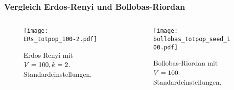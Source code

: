 \begin{frame}[t]
    \frametitle{Vergleich Erdos-Renyi und Bollobas-Riordan}
    \begin{columns}
        \begin{column}{0.5\textwidth}
            \begin{figure}[htpb]
                \centering
                \texttt{[image: ERs\_totpop\_100-2.pdf]}
                \caption{Erdos-Renyi mit $V = 100, \bar{k} = 2$.
                Standardeinstellungen.}%
                \label{fig:ERs_totpop_100-2}
            \end{figure}
        \end{column}
        \begin{column}{0.5\textwidth}
            \begin{figure}[htpb]
                \centering
                \texttt{[image: bollobas\_totpop\_seed\_100.pdf]}
                \caption{Bollobas-Riordan mit $V = 100$.
                Standardeinstellungen.}%
                \label{fig:bollobas_totpop_seed_100}
            \end{figure}
        \end{column}
    \end{columns}
\end{frame}


